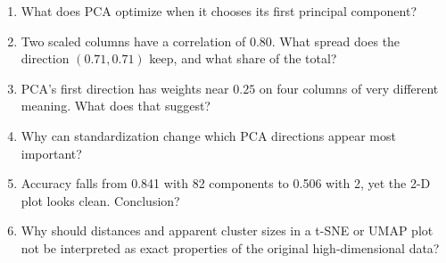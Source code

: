\begin{quickcheck}
\begin{enumerate}
  \item What does PCA optimize when it chooses its first principal component?
  \item Two scaled columns have a correlation of 0.80. What spread does the direction $(0.71,0.71)$ keep, and what share of the total?
  \item PCA's first direction has weights near $0.25$ on four columns of very different meaning. What does that suggest?
  \item Why can standardization change which PCA directions appear most important?
  \item Accuracy falls from 0.841 with 82 components to 0.506 with 2, yet the 2-D plot looks clean. Conclusion?
  \item Why should distances and apparent cluster sizes in a t-SNE or UMAP plot not be interpreted as exact properties of the original high-dimensional data?
\end{enumerate}
\end{quickcheck}
